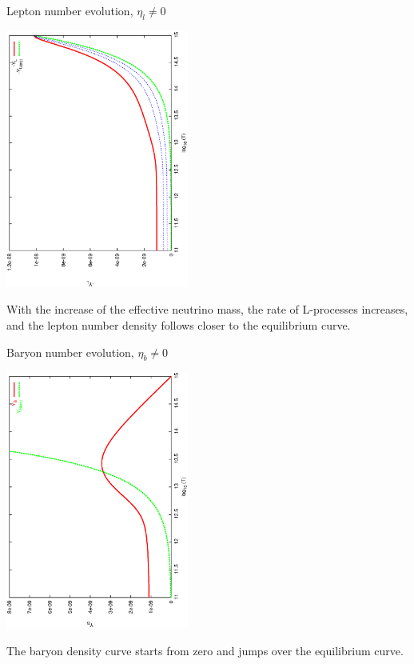 \documentclass[pdf,UofT06talk,slideColor,colorBG,accumulate]{prosper}
\begin{document}
\begin{slide}{Lepton number evolution, $ \eta_l \neq 0 $}

\begin{center}
\includegraphics[width=6cm,angle=270]{l_dom_asymm_bau.ps}
\end{center}
	With the increase of the effective neutrino mass, 
	the rate of L-processes increases, and the lepton number
	density follows closer to the equilibrium curve.

\end{slide}

\begin{slide}{Baryon number evolution, $ \eta_b \neq 0 $}

\begin{center}
\includegraphics[width=6cm,angle=270]{b_dom_asymm_bau.ps}
\end{center}

	The baryon density curve starts from zero and
	jumps over the equilibrium curve.

\end{slide}
\end{document}

